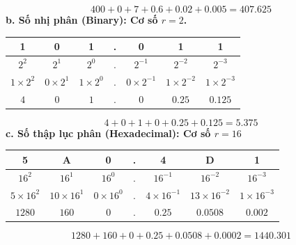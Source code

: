 \[
    400 + 0 + 7 + 0.6 + 0.02 + 0.005 = 407.625
\]
\textbf{b. Số nhị phân (Binary): Cơ số $r=2$.}
\begin{table}[h!]
    \centering
    \begin{tabular}{|c|c|c|c|c|c|c|}
    \hline
    \textbf{1}                                   & \textbf{0}                                   & \textbf{1}                                   & \textbf{.} & \textbf{0}                                        & \textbf{1}                                        & \textbf{1}                                        \\ \hline
    $2^2$                        & $2^1$                        & $2^0$                        & .          & $2^{-1} $                       & $2^{-2}$                        & $2^{-3}$                        \\ 
    $1\times 2^2$ & $0\times 2^1$ & $1\times 2^0$ & .          & $0\times 2^{-1}$ & $1\times 2^{-2}$ & $1\times 2^{-3}$ \\ 
   $ 4 $                                         & $0$                                            & $1$                                            & .          & $0$                                               & $0.25$                                              & $0.125$                                             \\ \hline
    \end{tabular}
\end{table}
\[
    4 + 0 +1+0+0.25+0.125=5.375
\]
\textbf{c. Số thập lục phân (Hexadecimal): Cơ số $r=16$}
\begin{table}[h!]
    \centering
    \begin{tabular}{|c|c|c|c|c|c|c|}
    \hline
    \textbf{5}     & \textbf{A}      & \textbf{0}     & \textbf{.} & \textbf{4}        & \textbf{D}         & \textbf{1}        \\ \hline
    $16^2$         & $16^1$          & $16^0$         & .          & $16^{-1} $        & $16^{-2}$          & $16^{-3}$         \\ 
    $5\times 16^2$ & $10\times 16^1$ & $0\times 16^0$ & .          & $4\times 16^{-1}$ & $13\times 16^{-2}$ & $1\times 16^{-3}$ \\ 
    $ 1280 $       & $160$           & $0$            & .          & $0.25$            & $0.0508$           & $0.002$           \\ \hline
    \end{tabular}
\end{table}
\[
    1280 + 160+0+0.25+0.0508+0.0002 = 1440.301
\]
